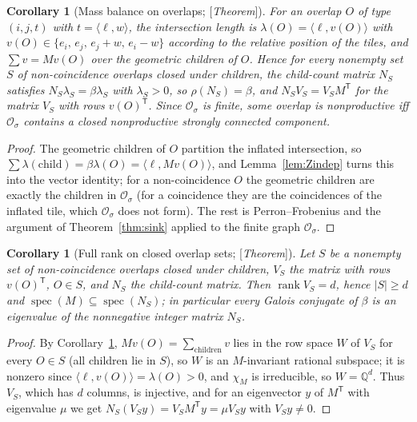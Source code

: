\documentclass[11pt]{amsart}
\theoremstyle{plain}
\newtheorem{corollary}[theorem]{Corollary}
\theoremstyle{definition}
\theoremstyle{remark}
\newcommand{\Q}{\mathbb{Q}}
\newcommand{\rank}{\operatorname{rank}}
\newcommand{\spec}{\operatorname{spec}}
\newcommand{\Status}[1]{\textup{[\textit{#1}]}}
\begin{document}
\begin{corollary}[Mass balance on overlaps; \Status{Theorem}]\label{cor:overlap-mass}
For an overlap $O$ of type $(i,j,t)$ with $t=\langle\ell,w\rangle$, the intersection length is $\lambda(O)=\langle\ell,v(O)\rangle$ with $v(O)\in\{e_i,\,e_j,\,e_j+w,\,e_i-w\}$ according to the relative position of the tiles, and $\sum v=Mv(O)$ over the geometric children of $O$. Hence for every nonempty set $S$ of non-coincidence overlaps closed under children, the child-count matrix $N_S$ satisfies $N_S\lambda_S=\beta\lambda_S$ with $\lambda_S>0$, so $\rho(N_S)=\beta$, and $N_SV_S=V_SM^{\mathsf T}$ for the matrix $V_S$ with rows $v(O)^{\mathsf T}$. Since $\mathcal O_\sigma$ is finite, some overlap is nonproductive iff $\mathcal O_\sigma$ contains a closed nonproductive strongly connected component.
\end{corollary}
\begin{proof}
The geometric children of $O$ partition the inflated intersection, so $\sum\lambda(\text{child})=\beta\lambda(O)=\langle\ell,Mv(O)\rangle$, and Lemma~\ref{lem:Zindep} turns this into the vector identity; for a non-coincidence $O$ the geometric children are exactly the children in $\mathcal O_\sigma$ (for a coincidence they are the coincidences of the inflated tile, which $\mathcal O_\sigma$ does not form). The rest is Perron--Frobenius and the argument of Theorem~\ref{thm:sink} applied to the finite graph $\mathcal O_\sigma$.
\end{proof}

\begin{corollary}[Full rank on closed overlap sets; \Status{Theorem}]\label{cor:overlap-rank}
Let $S$ be a nonempty set of non-coincidence overlaps closed under children, $V_S$ the matrix with rows $v(O)^{\mathsf T}$, $O\in S$, and $N_S$ the child-count matrix. Then $\rank V_S=d$, hence $|S|\ge d$ and $\spec(M)\subseteq\spec(N_S)$; in particular every Galois conjugate of $\beta$ is an eigenvalue of the nonnegative integer matrix $N_S$.
\end{corollary}
\begin{proof}
By Corollary~\ref{cor:overlap-mass}, $Mv(O)=\sum_{\text{children}}v$ lies in the row space $W$ of $V_S$ for every $O\in S$ (all children lie in $S$), so $W$ is an $M$-invariant rational subspace; it is nonzero since $\langle\ell,v(O)\rangle=\lambda(O)>0$, and $\chi_M$ is irreducible, so $W=\Q^d$. Thus $V_S$, which has $d$ columns, is injective, and for an eigenvector $y$ of $M^{\mathsf T}$ with eigenvalue $\mu$ we get $N_S(V_Sy)=V_SM^{\mathsf T}y=\mu V_Sy$ with $V_Sy\ne0$.
\end{proof}
\end{document}

